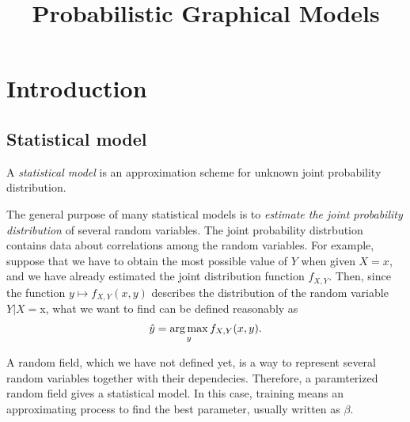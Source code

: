\documentclass{../exp}
\title{Probabilistic Graphical Models}
\begin{document}
\maketitle
\tableofcontents

%






\section{Introduction}

\subsection{Statistical model}
\begin{defn}
A \emph{statistical model} is an approximation scheme for unknown joint probability distribution.
\end{defn}
The general purpose of many statistical models is to \emph{estimate the joint probability distribution} of several random variables.
The joint probability distrbution contains data about correlations among the random variables.
For example, suppose that we have to obtain the most possible value of $Y$ when given $X=x$, and we have already estimated the joint distribution function $f_{X,Y}$.
Then, since the function $y\mapsto f_{X,Y}(x,y)$ describes the distribution of the random variable $Y|X=$x, what we want to find can be defined reasonably as
\[\hat y=\operatorname*{arg\,max}_yf_{X,Y}(x,y).\]

\begin{ex}
A random field, which we have not defined yet, is a way to represent several random variables together with their dependecies.
Therefore, a paramterized random field gives a statistical model.
In this case, training means an approximating process to find the best parameter, usually written as $\beta$.
\end{ex}
\end{document}

